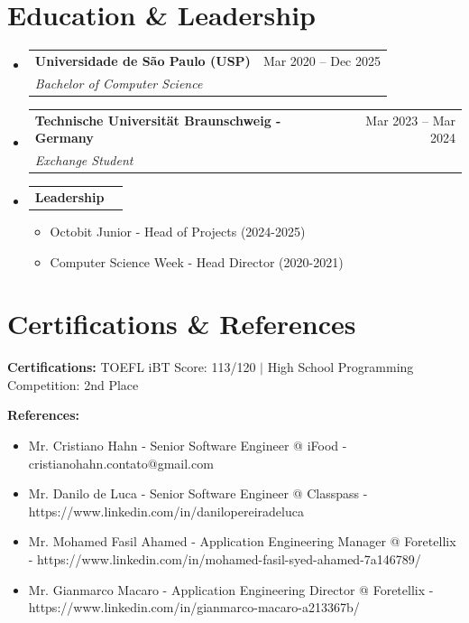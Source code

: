 \documentclass[letterpaper,11pt]{article}
\makeatletter
\newcommand{\resumeItem}[1]{
  \item\small{#1}
}
\newcommand{\resumeSubheading}[4]{
  \vspace{1pt}\item
    \begin{tabular*}{0.97\textwidth}[t]{l@{\extracolsep{\fill}}r}
      \textbf{#1} & #2 \\
      \textit{#3} & \textit{#4} \\
    \end{tabular*}\vspace{-4pt}
}
\newcommand{\resumeSubheadingTwo}[2]{
  \vspace{1pt}\item
    \begin{tabular*}{0.97\textwidth}[t]{l@{\extracolsep{\fill}}r}
      \textbf{#1} & #2 \\
    \end{tabular*}\vspace{-4pt}
}
\makeatother
\begin{document}
\section{Education \& Leadership}
\begin{itemize}[leftmargin=0.15in, label={}]
    \resumeSubheading
        {Universidade de São Paulo (USP)}{Mar 2020 -- Dec 2025}
        {Bachelor of Computer Science}{}
    
    \resumeSubheading
        {Technische Universität Braunschweig - Germany}{Mar 2023 -- Mar 2024}
        {Exchange Student}{}
    
    \resumeSubheadingTwo
        {Leadership}{}
        \begin{itemize}[leftmargin=0.25in, label=\textbullet, itemsep=2pt]
            \resumeItem{Octobit Junior - Head of Projects (2024-2025)}
            \resumeItem{Computer Science Week - Head Director (2020-2021)}
        \end{itemize}
\end{itemize}

\section{Certifications \& References}
\begin{itemize}[leftmargin=0.15in, label={}]
    \small{\item \textbf{Certifications:} TOEFL iBT Score: 113/120 $|$ High School Programming Competition: 2nd Place}
    \small{\item \textbf{References:} 
        \begin{itemize}[leftmargin=0.15in, label=\textbullet]
            \item Mr. Cristiano Hahn - Senior Software Engineer @ iFood - cristianohahn.contato@gmail.com
            \item Mr. Danilo de Luca - Senior Software Engineer @ Classpass - https://www.linkedin.com/in/danilopereiradeluca
            \item Mr. Mohamed Fasil Ahamed - Application Engineering Manager @ Foretellix - https://www.linkedin.com/in/mohamed-fasil-syed-ahamed-7a146789/
            \item Mr. Gianmarco Macaro - Application Engineering Director @ Foretellix - https://www.linkedin.com/in/gianmarco-macaro-a213367b/
        \end{itemize}
    }
\end{itemize}
\end{document}
